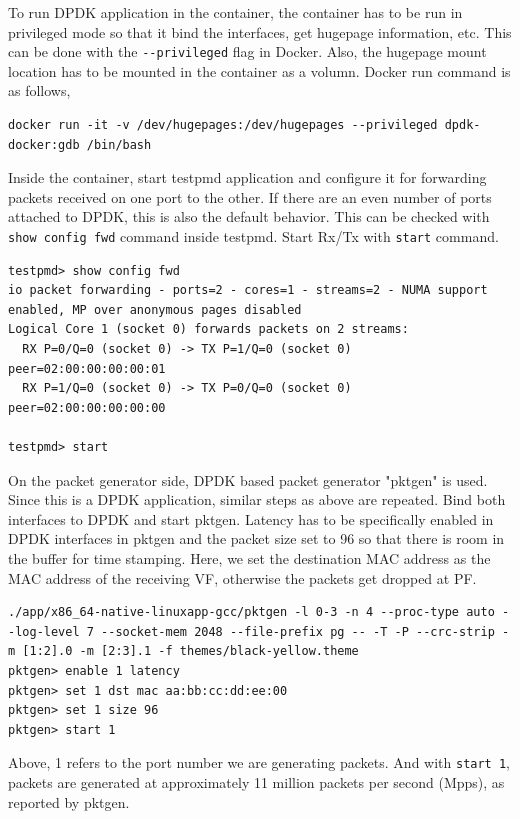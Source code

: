 \documentclass[english, 12pt, a4paper, elec, utf8, a-1b, online]{aaltothesis}
\begin{document}
To run DPDK application in the container, the container has to be run in privileged mode so that it bind the interfaces, get hugepage information, etc. This can be done with the \lstinline{--privileged} flag in Docker. Also, the hugepage mount location has to be mounted in the container as a volumn. Docker run command is as follows,
\begin{lstlisting}[basicstyle={\small\ttfamily}]
docker run -it -v /dev/hugepages:/dev/hugepages --privileged dpdk-docker:gdb /bin/bash
\end{lstlisting}

Inside the container, start testpmd application and configure it for forwarding packets received on one port to the other. If there are an even number of ports attached to DPDK, this is also the default behavior. This can be checked with \lstinline{show config fwd} command inside testpmd. Start Rx/Tx with \lstinline{start} command.

\begin{lstlisting}[basicstyle={\small\ttfamily}]
testpmd> show config fwd
io packet forwarding - ports=2 - cores=1 - streams=2 - NUMA support enabled, MP over anonymous pages disabled
Logical Core 1 (socket 0) forwards packets on 2 streams:
  RX P=0/Q=0 (socket 0) -> TX P=1/Q=0 (socket 0) peer=02:00:00:00:00:01
  RX P=1/Q=0 (socket 0) -> TX P=0/Q=0 (socket 0) peer=02:00:00:00:00:00

testpmd> start
\end{lstlisting}

On the packet generator side, DPDK based packet generator "pktgen" is used. Since this is a DPDK application, similar steps as above are repeated. Bind both interfaces to DPDK and start pktgen.
Latency has to be specifically enabled in DPDK interfaces in pktgen and the packet size set to 96 so that there is room in the buffer for time stamping. Here, we set the destination MAC address as the MAC address of the receiving VF, otherwise the packets get dropped at PF.

\begin{lstlisting}[basicstyle={\small\ttfamily}]
./app/x86_64-native-linuxapp-gcc/pktgen -l 0-3 -n 4 --proc-type auto --log-level 7 --socket-mem 2048 --file-prefix pg -- -T -P --crc-strip -m [1:2].0 -m [2:3].1 -f themes/black-yellow.theme
pktgen> enable 1 latency
pktgen> set 1 dst mac aa:bb:cc:dd:ee:00
pktgen> set 1 size 96
pktgen> start 1
\end{lstlisting}
Above, 1 refers to the port number we are generating packets. And with \lstinline{start 1}, packets are generated at approximately 11 million packets per second (Mpps), as reported by pktgen.
\end{document}
